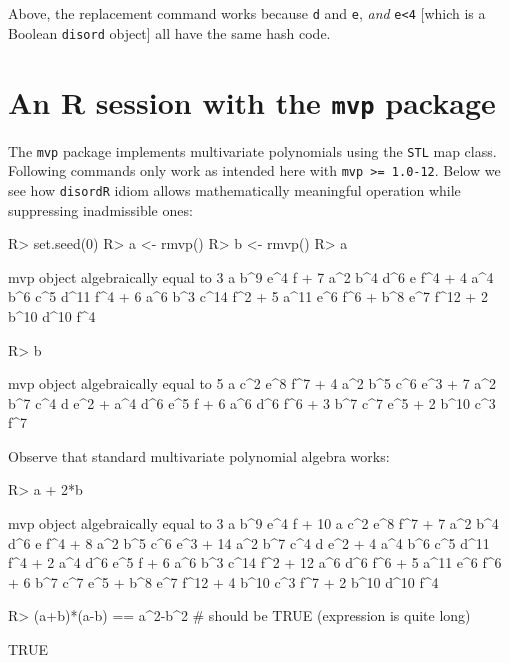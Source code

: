 \documentclass{article}
\begin{document}
Above, the replacement command works because {\tt d} and {\tt e}, {\em
and} {\tt e<4} [which is a Boolean {\tt disord} object] all have the
same hash code.

\section{An R session with the {\tt mvp} package}

The {\tt mvp} package implements multivariate polynomials using the
{\tt STL} map class.  Following commands only work as intended here
with {\tt mvp >= 1.0-12}.  Below we see how {\tt disordR} idiom allows
mathematically meaningful operation while suppressing inadmissible
ones:

\begin{Schunk}
\begin{Sinput}
R> set.seed(0)
R> a <- rmvp()
R> b <- rmvp()
R> a
\end{Sinput}
\begin{Soutput}
mvp object algebraically equal to
3 a b^9 e^4 f  +  7 a^2 b^4 d^6 e f^4  +  4 a^4 b^6 c^5 d^11 f^4  +
6 a^6 b^3 c^14 f^2  +  5 a^11 e^6 f^6  +  b^8 e^7 f^12  +  2 b^10 d^10 f^4
\end{Soutput}
\begin{Sinput}
R> b
\end{Sinput}
\begin{Soutput}
mvp object algebraically equal to
5 a c^2 e^8 f^7  +  4 a^2 b^5 c^6 e^3  +  7 a^2 b^7 c^4 d e^2  +
a^4 d^6 e^5 f  +  6 a^6 d^6 f^6  +  3 b^7 c^7 e^5  +  2 b^10 c^3 f^7
\end{Soutput}
\end{Schunk}

Observe that standard multivariate polynomial algebra works:

\begin{Schunk}
\begin{Sinput}
R> a + 2*b
\end{Sinput}
\begin{Soutput}
mvp object algebraically equal to
3 a b^9 e^4 f  +  10 a c^2 e^8 f^7  +  7 a^2 b^4 d^6 e f^4  +
8 a^2 b^5 c^6 e^3  +  14 a^2 b^7 c^4 d e^2  +  4 a^4 b^6 c^5 d^11 f^4  +
2 a^4 d^6 e^5 f  +  6 a^6 b^3 c^14 f^2  +  12 a^6 d^6 f^6  +
5 a^11 e^6 f^6  +  6 b^7 c^7 e^5  +  b^8 e^7 f^12  +  4 b^10 c^3 f^7  +
2 b^10 d^10 f^4
\end{Soutput}
\begin{Sinput}
R> (a+b)*(a-b) == a^2-b^2   # should be TRUE (expression is quite long)
\end{Sinput}
\begin{Soutput}
[1] TRUE
\end{Soutput}
\end{Schunk}
\end{document}

